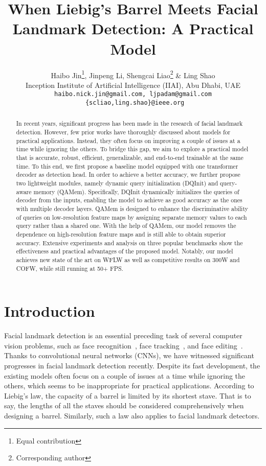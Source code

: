 \documentclass{article}
\title{When Liebig's Barrel Meets Facial Landmark Detection: A Practical Model}
\author{Haibo Jin\thanks{Equal contribution}, \hspace{1mm} Jinpeng Li\footnotemark[1], \hspace{1mm} Shengcai Liao\thanks{Corresponding author} \hspace{1mm} \& \hspace{1mm} Ling Shao \\
Inception Institute of Artificial Intelligence (IIAI), Abu Dhabi, UAE\\
\texttt{haibo.nick.jin@gmail.com, ljpadam@gmail.com} \\
\texttt{ \{scliao,ling.shao\}@ieee.org} \\
}
\begin{document}
\maketitle

\begin{abstract}
In recent years, significant progress has been made in the research of facial landmark detection. However, few prior works have thoroughly discussed about models for practical applications. Instead, they often focus on improving a couple of issues at a time while ignoring the others. To bridge this gap, we aim to explore a practical model that is accurate, robust, efficient, generalizable, and end-to-end trainable at the same time. To this end, we first propose a baseline model equipped with one transformer decoder as detection head. In order to achieve a better accuracy, we further propose two lightweight modules, namely dynamic query initialization (DQInit) and query-aware memory (QAMem). Specifically, DQInit dynamically initializes the queries of decoder from the inputs, enabling the model to achieve as good accuracy as the ones with multiple decoder layers. QAMem is designed to enhance the discriminative ability of queries on low-resolution feature maps by assigning separate memory values to each query rather than a shared one. With the help of QAMem, our model removes the dependence on high-resolution feature maps and is still able to obtain superior accuracy. Extensive experiments and analysis on three popular benchmarks show the effectiveness and practical advantages of the proposed model. Notably, our model achieves new state of the art on WFLW as well as competitive results on 300W and COFW, while still running at 50+ FPS. 
\end{abstract}

\section{Introduction}
\label{sec:1}

Facial landmark detection is an essential preceding task of several computer vision problems, such as face recognition~\citep{TYR14, LWY17, LJL13}, face tracking~\citep{KMT17}, and face editing~\citep{TZS16}. Thanks to convolutional neural networks (CNNs), we have witnessed significant progresses in facial landmark detection recently. Despite its fast development, the existing models often focus on a couple of issues at a time while ignoring the others, which seems to be inappropriate for practical applications. According to Liebig's law, the capacity of a barrel is limited by its shortest stave. That is to say, the lengths of all the staves should be considered comprehensively when designing a barrel. Similarly, such a law also applies to facial landmark detectors. 
\end{document}
